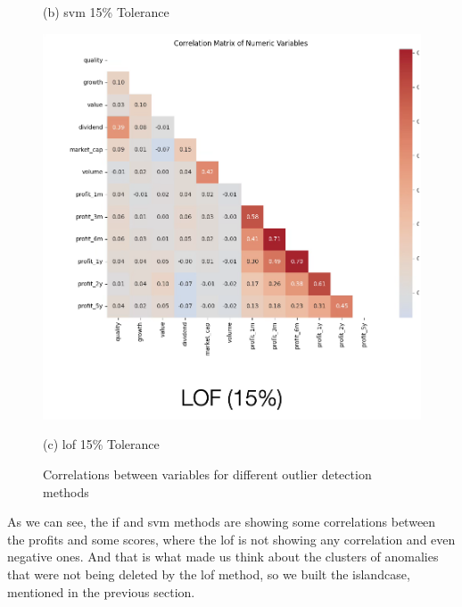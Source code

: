\documentclass[11pt,english,a4paper,hidelinks]{book}
\begin{document}
\begin{figure}[H]
\begin{minipage}{0.32\textwidth}
        \caption*{(b) \acrshort{svm} 15\% Tolerance}
    \end{minipage}
    \hfill
    \begin{minipage}{0.32\textwidth}
        \centering
        \includegraphics[width=\textwidth]{images/code/outliers/LOF 15.png}
        \caption*{(c) \acrshort{lof} 15\% Tolerance}
    \end{minipage}
    \caption{Correlations between variables for different outlier detection methods}
    \label{fig:island_cases_examples}
\end{figure}

\noindent As we can see, the \acrshort{if} and \acrshort{svm} methods are showing some correlations between the profits and some scores, where the \acrshort{lof} is not showing any correlation and even negative ones. And that is what made us think about the clusters of anomalies that were not being deleted by the \acrshort{lof} method, so we built the \acrshort{islandcase}, mentioned in the previous section.
\end{document}
